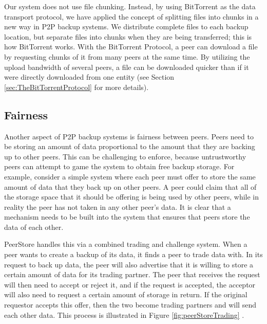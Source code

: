 \documentclass[12pt]{report}
\begin{document}
Our system does not use file chunking. Instead, by using BitTorrent as the data transport protocol, we have applied the concept of splitting files into chunks in a new way in P2P backup systems. We distribute complete files to each backup location, but separate files into chunks when they are being transferred; this is how BitTorrent works. With the BitTorrent Protocol, a peer can download a file by requesting chunks of it from many peers at the same time. By utilizing the upload bandwidth of several peers, a file can be downloaded quicker than if it were directly downloaded from one entity (see Section \ref{sec:TheBitTorrentProtocol} for more details).

\subsection{Fairness} \label{sec:Fairness_chap:Background}
Another aspect of P2P backup systems is fairness between peers. Peers need to be storing an amount of data proportional to the amount that they are backing up to other peers. This can be challenging to enforce, because untrustworthy peers can attempt to game the system to obtain free backup storage. For example, consider a simple system where each peer must offer to store the same amount of data that they back up on other peers. A peer could claim that all of the storage space that it should be offering is being used by other peers, while in reality the peer has not taken in any other peer's data. It is clear that a mechanism needs to be built into the system that ensures that peers store the data of each other.

PeerStore handles this via a combined trading and challenge system. When a peer wants to create a backup of its data, it finds a peer to trade data with. In its request to back up data, the peer will also advertise that it is willing to store a certain amount of data for its trading partner. The peer that receives the request will then need to accept or reject it, and if the request is accepted, the acceptor will also need to request a certain amount of storage in return. If the original requestor accepts this offer, then the two become trading partners and will send each other data. This process is illustrated in Figure \ref{fig:peerStoreTrading} \cite{PeerStore}.
\end{document}
